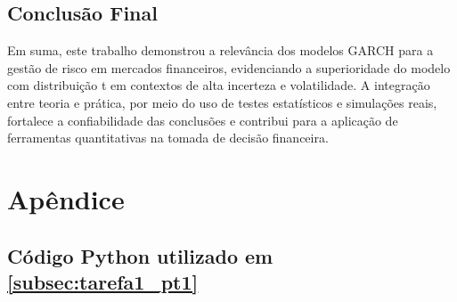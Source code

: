 \documentclass[a4paper, 12pt]{article}
\begin{document}
\subsection{Conclusão Final}

Em suma, este trabalho demonstrou a relevância dos modelos GARCH para a gestão de risco em mercados financeiros, evidenciando a superioridade do modelo com distribuição t em contextos de alta incerteza e volatilidade. A integração entre teoria e prática, por meio do uso de testes estatísticos e simulações reais, fortalece a confiabilidade das conclusões e contribui para a aplicação de ferramentas quantitativas na tomada de decisão financeira.



\newpage
\section{Apêndice}

\subsection{Código Python utilizado em \ref{subsec:tarefa1_pt1}}\label{apendice:codigo_tarefa1_pt1}
\end{document}
